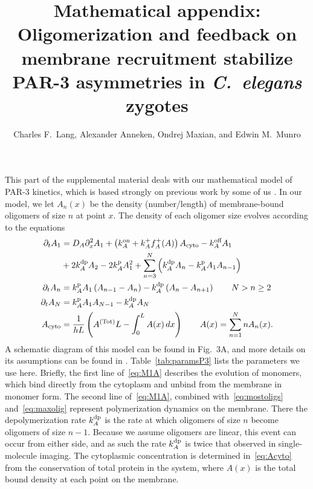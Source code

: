 \documentclass[11pt]{article}
\title{Mathematical appendix: \\ Oligomerization and feedback on membrane recruitment stabilize PAR-3 asymmetries in \emph{C.\ elegans} zygotes}
\author{Charles F.\ Lang, Alexander Anneken,  Ondrej Maxian, and Edwin M.\ Munro }
\date{}
\newcommand{\6}[1]{#1_{\text{6}}}
\newcommand{\3}[1]{#1_{\text{3}}}
\newcommand{\Tot}[1]{#1^\text{(Tot)}}
\newcommand{\A}[1]{#1_A}
\begin{document}
\maketitle
This part of the supplemental material deals with our mathematical model of PAR-3 kinetics, which is based strongly on previous work by some of us \cite{lang2022oligomerization}. In our model, we let $A_n(x)$ be the density (number/length) of membrane-bound oligomers of size $n$ at point $x$. The density of each oligomer size evolves according to the equations
\cite[Eq.~(1)]{lang2022oligomerization}
\begin{subequations}
\label{eq:P3model}
\begin{align}
\label{eq:M1A}
\Dt \MA & = \A{D} \Dx^2 \MA + \left(\A{\kon}+\A{\kf}\A{f}^+(A)\right)  \MAC  - \koff_A \MA \\ \nonumber &+ 2\A{\kdp}A_2 -2\A{\kp} \MA^2+ \sum_{n=3}^N  \left(\A{\kdp}A_{n}-\A{\kp}\MA A_{n-1}\right) \\
\label{eq:mostoligs}
\Dt A_n & =\A{\kp}\MA \left(A_{n-1}-A_n\right)- \A{\kdp}\left(A_n-A_{n+1}\right) \qquad N > n \geq 2 \\ 
\label{eq:maxolig}
\Dt A_N & =\A{\kp}\MA A_{N-1}- \A{\kdp}A_N \\  \label{eq:Acyto}
A_\text{cyto} & = \frac{1}{h L} \left(\Tot{A} L - \int_0^L A(x) \, dx \right) \qquad A(x) =\sum_{n=1}^N n A_n(x).
\end{align}
\end{subequations}
A schematic diagram of this model can be found in Fig.\ 3A, and more details on its assumptions can be found in \cite{lang2022oligomerization}. Table\ \ref{tab:paramsP3} lists the parameters we use here. Briefly, the first line of\ \eqref{eq:M1A} describes the evolution of monomers, which bind directly from the cytoplasm and unbind from the membrane in monomer form. The second line of\ \eqref{eq:M1A}, combined with\ \eqref{eq:mostoligs} and\ \eqref{eq:maxolig} represent polymerization dynamics on the membrane. There the depolymerization rate $k^\text{dp}_A$ is the rate at which oligomers of size $n$ become oligomers of size $n-1$. Because we assume oligomers are linear, this event can occur from either side, and as such the rate $k^\text{dp}_A$ is twice that observed in single-molecule imaging.  The cytoplasmic concentration is determined in\ \eqref{eq:Acyto} from the conservation of total protein in the system, where $A(x)$ is the total bound density at each point on the membrane.  
\end{document}

